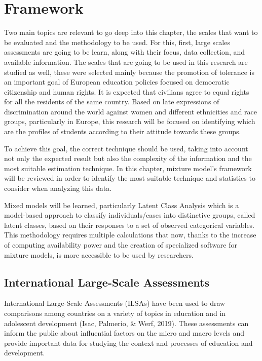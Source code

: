 \documentclass[12pt,a4paper,oneside]{reedthesis}
\begin{document}
\clearpage

\hypertarget{framework}{%
\chapter{Framework}\label{framework}}

Two main topics are relevant to go deep into this chapter, the scales that want to be evaluated and the methodology to be used. For this, first, large scales assessments are going to be learn, along with their focus, data collection, and available information. The scales that are going to be used in this research are studied as well, these were selected mainly because the promotion of tolerance is an important goal of European education policies focused on democratic citizenship and human rights. It is expected that civilians agree to equal rights for all the residents of the same country. Based on late expressions of discrimination around the world against women and different ethnicities and race groups, particularly in Europe, this research will be focused on identifying which are the profiles of students according to their attitude towards these groups.

To achieve this goal, the correct technique should be used, taking into account not only the expected result but also the complexity of the information and the most suitable estimation technique. In this chapter, mixture model's framework will be reviewed in order to identify the most suitable technique and statistics to consider when analyzing this data.

Mixed models will be learned, particularly Latent Class Analysis which is a model-based approach to classify individuals/cases into distinctive groups, called latent classes, based on their responses to a set of observed categorical variables. This methodology requires multiple calculations that now, thanks to the increase of computing availability power and the creation of specialized software for mixture models, is more accessible to be used by researchers.

\hypertarget{international-large-scale-assessments}{%
\section{International Large-Scale Assessments}\label{international-large-scale-assessments}}

International Large-Scale Assessments (ILSAs) have been used to draw comparisons among countries on a variety of topics in education and in adolescent development (Isac, Palmerio, \& Werf, 2019). These assessments can inform the public about influential factors on the micro and macro levels and provide important data for studying the context and processes of education and development.
\end{document}
